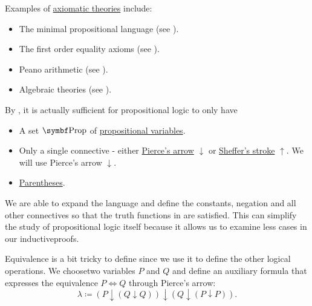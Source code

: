 \begin{Example}\label{ex:axiomatic_theory}
  Examples of \hyperref[def:propositional_theory]{axiomatic theories} include:
  \begin{itemize}
    \item The minimal propositional language (see ).
    \item The first order equality axioms (see ).
    \item Peano arithmetic (see ).
    \item Algebraic theories (see ).
  \end{itemize}
\end{Example}

\begin{Remark}\label{remark:minimal_propositional_language}
  By , it is actually sufficient for propositional logic to only have
  \begin{itemize}
    \item A set \( \Bold{Prop} \) of \hyperref[def:propositional_language/prop]{propositional variables}.
    \item Only a single connective - either \hyperref[def:propositional_language/connectives/pierces_arrow]{Pierce's arrow} \( \downarrow \) or \hyperref[def:propositional_language/sheffer_stroke]{Sheffer's stroke} \( \uparrow \). We will use Pierce's arrow \( \downarrow \).
    \item \hyperref[def:propositional_language/parentheses]{Parentheses}.
  \end{itemize}

  We are able to expand the language and define the constants, negation and all other connectives so that the truth functions in  are satisfied. This can simplify the study of propositional logic itself because it allows us to examine less cases in our inductive\IND proofs.

  Equivalence is a bit tricky to define since we use it to define the other logical operations. We choose\AOC two variables \( P \) and \( Q \) and define an auxiliary formula that expresses the equivalence \( P \iff Q \) through Pierce's arrow:
  \begin{equation*}
    \lambda \coloneqq (P \downarrow (Q \downarrow Q)) \downarrow (Q \downarrow (P \downarrow P)).
  \end{equation*}


\end{Remark}
